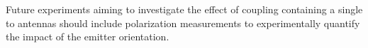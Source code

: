 				Future experiments aiming to investigate the effect of coupling \nds containing a single \siv to antennas should include polarization measurements to experimentally quantify the impact of the emitter orientation.
				\\

